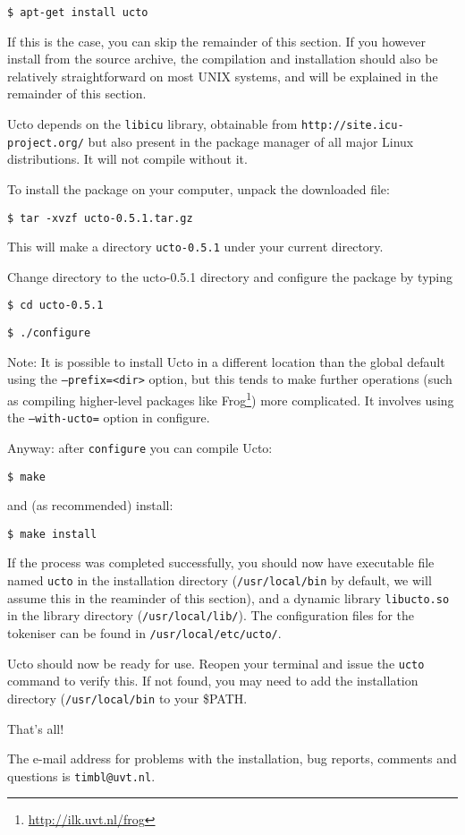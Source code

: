 \documentclass{report}
\begin{document}
{\tt \$ apt-get install ucto}    

If this is the case, you can skip the remainder of this section. If you however install from the source archive, the compilation and installation should also be relatively straightforward on most UNIX systems, and will be explained in the remainder of this section. 

Ucto depends on the {\tt libicu} library, obtainable from {\tt http://site.icu-project.org/} but also present in the package manager of all major Linux distributions. It will not compile without it.

To install the package on your computer, unpack the downloaded file:

{\tt \$ tar -xvzf ucto-0.5.1.tar.gz}

This will make a directory {\tt ucto-0.5.1} under your current directory.

Change directory to the ucto-0.5.1 directory and configure the package by typing

{\tt \$ cd ucto-0.5.1}

{\tt \$ ./configure}


Note: It is possible to install Ucto in a different location than the global default using the \texttt{--prefix=<dir>} option, but this tends to make further operations (such as compiling higher-level packages like Frog\footnote{\url{http://ilk.uvt.nl/frog}}) more complicated. It involves using the {\tt --with-ucto=} option in configure. 
 
Anyway: after {\tt configure} you can compile Ucto:

{\tt \$ make}

and (as recommended) install:

{\tt \$ make install }

If the process was completed successfully, you should now have
executable file named {\tt ucto} in the installation directory
({\tt /usr/local/bin} by default, we will assume this in the reaminder of this section), and a dynamic library {\tt libucto.so} in
the library directory ({\tt /usr/local/lib/}). The configuration files for the tokeniser can be found in {\tt /usr/local/etc/ucto/}.

Ucto should now be ready for use. Reopen your terminal and issue the {\tt ucto} command to verify this. If not found, you may need to add the installation directory ({\tt /usr/local/bin} to your \$PATH. 

That's all!

The e-mail address for problems with the installation, bug reports,
comments and questions is {\tt timbl@uvt.nl}.
\end{document}

